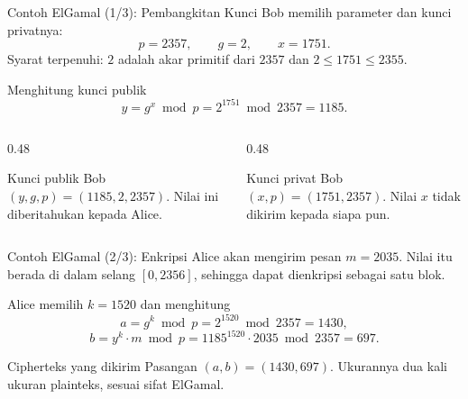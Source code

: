 \documentclass[aspectratio=169,11pt]{beamer}
\begin{document}
\begin{frame}{Contoh ElGamal (1/3): Pembangkitan Kunci}
    \footnotesize
    Bob memilih parameter dan kunci privatnya:
    \[
        p = 2357, \qquad g = 2, \qquad x = 1751 .
    \]
    Syarat terpenuhi: $2$ adalah akar primitif dari $2357$ dan
    $2 \le 1751 \le 2355$.
    \vspace{0.15cm}
    \begin{block}{Menghitung kunci publik}
        \footnotesize
        \[
            y = g^{x} \bmod p = 2^{1751} \bmod 2357 = 1185 .
        \]
    \end{block}
    \begin{columns}[T,onlytextwidth]
        \begin{column}{0.48\textwidth}
            \begin{exampleblock}{Kunci publik Bob}
                \footnotesize
                $(y,g,p) = (1185, 2, 2357)$. Nilai ini diberitahukan kepada
                Alice.
            \end{exampleblock}
        \end{column}
        \begin{column}{0.48\textwidth}
            \begin{alertblock}{Kunci privat Bob}
                \footnotesize
                $(x,p) = (1751, 2357)$. Nilai $x$ tidak dikirim kepada
                siapa pun.
            \end{alertblock}
        \end{column}
    \end{columns}
\end{frame}

\begin{frame}{Contoh ElGamal (2/3): Enkripsi}
    \footnotesize
    Alice akan mengirim pesan $m = 2035$. Nilai itu berada di dalam selang
    $[0,2356]$, sehingga dapat dienkripsi sebagai satu blok.
    \vspace{0.1cm}
    \begin{block}{Alice memilih $k = 1520$ dan menghitung}
        \footnotesize
        \[
            a = g^{k} \bmod p = 2^{1520} \bmod 2357 = 1430,
        \]
        \[
            b = y^{k} \cdot m \bmod p
              = 1185^{1520} \cdot 2035 \bmod 2357 = 697 .
        \]
    \end{block}
    \begin{exampleblock}{Cipherteks yang dikirim}
        \footnotesize
        Pasangan $(a,b) = (1430, 697)$. Ukurannya dua kali ukuran
        plainteks, sesuai sifat ElGamal.
    \end{exampleblock}
\end{frame}
\end{document}

